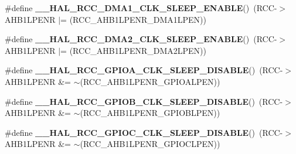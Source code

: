 \begin{DoxyCompactItemize}
\item 
\#define {\bfseries \+\_\+\+\_\+\+H\+A\+L\+\_\+\+R\+C\+C\+\_\+\+D\+M\+A1\+\_\+\+C\+L\+K\+\_\+\+S\+L\+E\+E\+P\+\_\+\+E\+N\+A\+B\+LE}()~(R\+CC-\/$>$A\+H\+B1\+L\+P\+E\+NR $\vert$= (R\+C\+C\+\_\+\+A\+H\+B1\+L\+P\+E\+N\+R\+\_\+\+D\+M\+A1\+L\+P\+EN))\hypertarget{group___r_c_c___a_h_b1___low_power___enable___disable_ga568e4d004285fe009bc4e5d33e13af61}{}\label{group___r_c_c___a_h_b1___low_power___enable___disable_ga568e4d004285fe009bc4e5d33e13af61}

\item 
\#define {\bfseries \+\_\+\+\_\+\+H\+A\+L\+\_\+\+R\+C\+C\+\_\+\+D\+M\+A2\+\_\+\+C\+L\+K\+\_\+\+S\+L\+E\+E\+P\+\_\+\+E\+N\+A\+B\+LE}()~(R\+CC-\/$>$A\+H\+B1\+L\+P\+E\+NR $\vert$= (R\+C\+C\+\_\+\+A\+H\+B1\+L\+P\+E\+N\+R\+\_\+\+D\+M\+A2\+L\+P\+EN))\hypertarget{group___r_c_c___a_h_b1___low_power___enable___disable_ga16c048816a705de87bb5fd3ce4003a82}{}\label{group___r_c_c___a_h_b1___low_power___enable___disable_ga16c048816a705de87bb5fd3ce4003a82}

\item 
\#define {\bfseries \+\_\+\+\_\+\+H\+A\+L\+\_\+\+R\+C\+C\+\_\+\+G\+P\+I\+O\+A\+\_\+\+C\+L\+K\+\_\+\+S\+L\+E\+E\+P\+\_\+\+D\+I\+S\+A\+B\+LE}()~(R\+CC-\/$>$A\+H\+B1\+L\+P\+E\+NR \&= $\sim$(R\+C\+C\+\_\+\+A\+H\+B1\+L\+P\+E\+N\+R\+\_\+\+G\+P\+I\+O\+A\+L\+P\+EN))\hypertarget{group___r_c_c___a_h_b1___low_power___enable___disable_gad6753edbd9047eeac39ae4f234642942}{}\label{group___r_c_c___a_h_b1___low_power___enable___disable_gad6753edbd9047eeac39ae4f234642942}

\item 
\#define {\bfseries \+\_\+\+\_\+\+H\+A\+L\+\_\+\+R\+C\+C\+\_\+\+G\+P\+I\+O\+B\+\_\+\+C\+L\+K\+\_\+\+S\+L\+E\+E\+P\+\_\+\+D\+I\+S\+A\+B\+LE}()~(R\+CC-\/$>$A\+H\+B1\+L\+P\+E\+NR \&= $\sim$(R\+C\+C\+\_\+\+A\+H\+B1\+L\+P\+E\+N\+R\+\_\+\+G\+P\+I\+O\+B\+L\+P\+EN))\hypertarget{group___r_c_c___a_h_b1___low_power___enable___disable_ga0a20ad851a2ef9e1ccdbf280dcd1dc44}{}\label{group___r_c_c___a_h_b1___low_power___enable___disable_ga0a20ad851a2ef9e1ccdbf280dcd1dc44}

\item 
\#define {\bfseries \+\_\+\+\_\+\+H\+A\+L\+\_\+\+R\+C\+C\+\_\+\+G\+P\+I\+O\+C\+\_\+\+C\+L\+K\+\_\+\+S\+L\+E\+E\+P\+\_\+\+D\+I\+S\+A\+B\+LE}()~(R\+CC-\/$>$A\+H\+B1\+L\+P\+E\+NR \&= $\sim$(R\+C\+C\+\_\+\+A\+H\+B1\+L\+P\+E\+N\+R\+\_\+\+G\+P\+I\+O\+C\+L\+P\+EN))\hypertarget{group___r_c_c___a_h_b1___low_power___enable___disable_ga293f9870ba631d23f8011bad12420f83}{}\label{group___r_c_c___a_h_b1___low_power___enable___disable_ga293f9870ba631d23f8011bad12420f83}


\end{DoxyCompactItemize}
